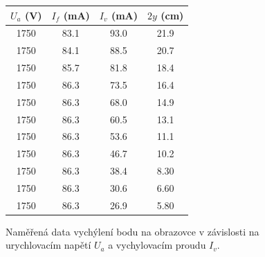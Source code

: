 \documentclass[a4paper,11pt]{article}
\begin{document}
\begin{figure}[h]
{    \begin{tabular}{| c c c c |}
        \hline
        $ U_a $ (V) & $ I_f $ (mA) & $ I_v $ (mA) & $ 2 y $ (cm)   \\
        \hline
        1750 & 83.1 & 93.0 & 21.9 \\
        1750 & 84.1 & 88.5 & 20.7 \\
        1750 & 85.7 & 81.8 & 18.4 \\
        1750 & 86.3 & 73.5 & 16.4 \\
        1750 & 86.3 & 68.0 & 14.9 \\
        1750 & 86.3 & 60.5 & 13.1 \\ 
        1750 & 86.3 & 53.6 & 11.1 \\
        1750 & 86.3 & 46.7 & 10.2 \\
        1750 & 86.3 & 38.4 & 8.30 \\
        1750 & 86.3 & 30.6 & 6.60 \\
        1750 & 86.3 & 26.9 & 5.80 \\
        \hline
    \end{tabular}
    }
    \hspace{1cm}
    \captionsetup{type=table}
    \caption{Naměřená data vychýlení bodu na obrazovce v závislosti na urychlovacím napětí $ U_a $ a vychylovacím proudu $ I_v $.  }
\end{figure}
\end{document}
